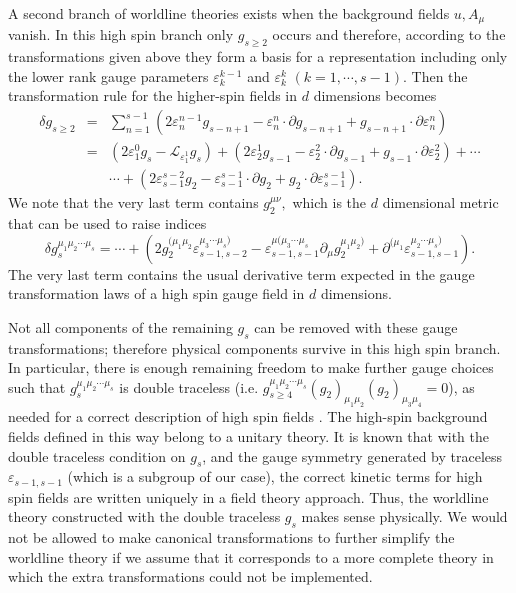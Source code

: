 \documentclass[a4paper,12pt]{article}
\begin{document}
A second branch of worldline theories exists when the background fields $%
u,A_{\mu }$ vanish. In this high spin branch only $g_{s\geq 2}$ occurs and
therefore, according to the transformations given above they form a basis
for a representation including only the lower rank gauge parameters $%
\varepsilon _{k}^{k-1}$ and $\varepsilon _{k}^{k}$ $(k=1,\cdots ,s-1)$. Then
the transformation rule for the higher-spin fields in $d$ dimensions becomes
\begin{eqnarray}
\delta g_{s\geq 2} &=&\sum_{n=1}^{s-1}\left( 2\varepsilon
_{n}^{n-1}g_{s-n+1}-\varepsilon _{n}^{n}\cdot \partial
g_{s-n+1}+g_{s-n+1}\cdot \partial \varepsilon _{n}^{n}\right)
\label{Wtransf} \\
&=&\left( 2\varepsilon _{1}^{0}g_{s}-\mathcal{L}_{\varepsilon
_{1}^{1}}g_{s}\right) +\left( 2\varepsilon _{2}^{1}g_{s-1}-\varepsilon
_{2}^{2}\cdot \partial g_{s-1}+g_{s-1}\cdot \partial \varepsilon
_{2}^{2}\right) +\cdots  \nonumber \\
&&\cdots +\left( 2\varepsilon _{s-1}^{s-2}g_{2}-\varepsilon
_{s-1}^{s-1}\cdot \partial g_{2}+g_{2}\cdot \partial \varepsilon
_{s-1}^{s-1}\right) .
\end{eqnarray}
We note that the very last term contains $g_{2}^{\mu \nu },$ which is the $d$
dimensional metric that can be used to raise indices
\begin{equation}
\delta g_{s}^{\mu _{1}\mu _{2}\cdots \mu _{s}}=\cdots +\left( 2g_{2}^{(\mu
_{1}\mu _{2}}\varepsilon _{s-1,s-2}^{\mu _{3}\cdots \mu _{s})}-\varepsilon
_{s-1,s-1}^{\mu (\mu _{3}\cdots \mu _{s}}\partial _{\mu }g_{2}^{\mu _{1}\mu
_{2})}+\partial ^{(\mu _{1}}\varepsilon _{s-1,s-1}^{\mu _{2}\cdots \mu
_{s})}\right) .  \label{sgauge}
\end{equation}
The very last term contains the usual derivative term expected in the gauge
transformation laws of a high spin gauge field in $d$ dimensions.

Not all components of the remaining $g_{s}$ can be removed with these gauge
transformations; therefore physical components survive in this high spin
branch. In particular, there is enough remaining freedom to make further
gauge choices such that $g_{s}^{\mu _{1}\mu _{2}\cdots \mu _{s}}$ is double
traceless (i.e. $g_{s\geq 4}^{\mu _{1}\mu _{2}\cdots \mu _{s}}\left(
g_{2}\right) _{\mu _{1}\mu _{2}}\left( g_{2}\right) _{\mu _{3}\mu _{4}}=0$),
as needed for a correct description of high spin fields \cite{fronsdal}. The
high-spin background fields defined in this way belong to a unitary theory.
It is known that with the double traceless condition on $g_{s}$, and the
gauge symmetry generated by traceless $\varepsilon _{s-1,s-1}$ (which is a
subgroup of our case), the correct kinetic terms for high spin fields are
written uniquely in a field theory approach. Thus, the worldline theory
constructed with the double traceless $g_{s}$ makes sense physically. We
would not be allowed to make canonical transformations to further simplify
the worldline theory if we assume that it corresponds to a more complete
theory in which the extra transformations could not be implemented.
\end{document}

